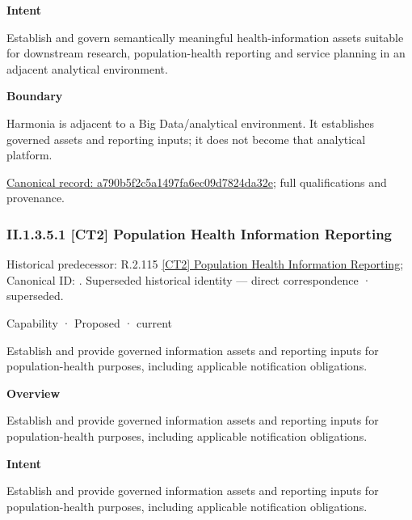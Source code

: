 \textbf{Intent}



Establish and govern semantically meaningful health-information assets suitable for downstream research, population-health reporting and service planning in an adjacent analytical environment.



\textbf{Boundary}



Harmonia is adjacent to a Big Data/analytical environment. It establishes governed assets and reporting inputs; it does not become that analytical platform.


{\footnotesize \href{../../../../continuum/strategy/capability/a790b5f2c5a1497fa6ec09d7824da32e.md}{Canonical record: a790b5f2c5a1497fa6ec09d7824da32e}; full qualifications and provenance.}\par
\subsubsection*{II.1.3.5.1 [CT2] Population Health Information Reporting}
\label{navigation:II.1.3.5.1}

{\small Historical predecessor: R.2.115 \hyperref[element:ced472b2d1a54016878ee541de969d9b]{[CT2] Population Health Information Reporting}; Canonical ID: \texttt{}. Superseded historical identity — direct correspondence · superseded.}\par
\label{element:2135b45eab034370b0063b20e821985d}
{\small Capability · Proposed · current}\par

Establish and provide governed information assets and reporting inputs for population-health purposes, including applicable notification obligations.



\textbf{Overview}



Establish and provide governed information assets and reporting inputs for population-health purposes, including applicable notification obligations.



\textbf{Intent}



Establish and provide governed information assets and reporting inputs for population-health purposes, including applicable notification obligations.



